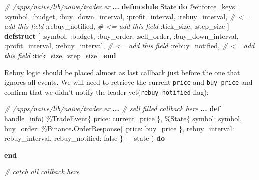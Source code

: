 \documentclass[
  oneside]{book}
\newenvironment{Shaded}{\begin{snugshade}}{\end{snugshade}}
\newcommand{\CommentTok}[1]{\textcolor[rgb]{0.56,0.35,0.01}{\textit{#1}}}
\newcommand{\ConstantTok}[1]{\textcolor[rgb]{0.00,0.00,0.00}{#1}}
\newcommand{\KeywordTok}[1]{\textcolor[rgb]{0.13,0.29,0.53}{\textbf{#1}}}
\newcommand{\NormalTok}[1]{#1}
\newcommand{\OperatorTok}[1]{\textcolor[rgb]{0.81,0.36,0.00}{\textbf{#1}}}
\newcommand{\OtherTok}[1]{\textcolor[rgb]{0.56,0.35,0.01}{#1}}
\newcommand{\VariableTok}[1]{\textcolor[rgb]{0.00,0.00,0.00}{#1}}
\begin{document}
\begin{Shaded}
\begin{Highlighting}[]
  \CommentTok{\# /apps/naive/lib/naive/trader.ex}
  \OperatorTok{...}
  \KeywordTok{defmodule} \ConstantTok{State} \KeywordTok{do}
    \OtherTok{@enforce\_keys}\NormalTok{ [}
      \VariableTok{:symbol}\NormalTok{,}
      \VariableTok{:budget}\NormalTok{,}
      \VariableTok{:buy\_down\_interval}\NormalTok{,}
      \VariableTok{:profit\_interval}\NormalTok{,}
      \VariableTok{:rebuy\_interval}\NormalTok{, }\CommentTok{\# \textless{}= add this field}
      \VariableTok{:rebuy\_notified}\NormalTok{, }\CommentTok{\# \textless{}= add this field}
      \VariableTok{:tick\_size}\NormalTok{,}
      \VariableTok{:step\_size}
\NormalTok{    ]}
    \KeywordTok{defstruct}\NormalTok{ [}
      \VariableTok{:symbol}\NormalTok{,}
      \VariableTok{:budget}\NormalTok{,}
      \VariableTok{:buy\_order}\NormalTok{,}
      \VariableTok{:sell\_order}\NormalTok{,}
      \VariableTok{:buy\_down\_interval}\NormalTok{,}
      \VariableTok{:profit\_interval}\NormalTok{,}
      \VariableTok{:rebuy\_interval}\NormalTok{, }\CommentTok{\# \textless{}= add this field}
      \VariableTok{:rebuy\_notified}\NormalTok{, }\CommentTok{\# \textless{}= add this field}
      \VariableTok{:tick\_size}\NormalTok{,}
      \VariableTok{:step\_size}
\NormalTok{    ]}
  \KeywordTok{end}
\end{Highlighting}
\end{Shaded}

Rebuy logic should be placed almost as last callback just before the one that ignores all events. We will need to retrieve the current \texttt{price} and \texttt{buy\_price} and confirm that we didn't notify the leader yet(\texttt{rebuy\_notified} flag):

\begin{Shaded}
\begin{Highlighting}[]
  \CommentTok{\# /apps/naive/lib/naive/trader.ex}
  \OperatorTok{...}
  \CommentTok{\# sell filled callback here}
  \OperatorTok{...}
  \KeywordTok{def}\NormalTok{ handle\_info(}
\NormalTok{        \%}\ConstantTok{TradeEvent}\NormalTok{\{}
          \VariableTok{price:}\NormalTok{ current\_price}
\NormalTok{        \},}
\NormalTok{        \%}\ConstantTok{State}\NormalTok{\{}
          \VariableTok{symbol:}\NormalTok{ symbol,}
          \VariableTok{buy\_order:}\NormalTok{ \%}\ConstantTok{Binance}\OperatorTok{.}\ConstantTok{OrderResponse}\NormalTok{\{}
            \VariableTok{price:}\NormalTok{ buy\_price}
\NormalTok{          \},}
          \VariableTok{rebuy\_interval:}\NormalTok{ rebuy\_interval,}
          \VariableTok{rebuy\_notified:} \ConstantTok{false}
\NormalTok{        \} }\OperatorTok{=}\NormalTok{ state}
\NormalTok{      ) }\KeywordTok{do}

  \KeywordTok{end}

  \CommentTok{\# catch all callback here}
\end{Highlighting}
\end{Shaded}
\end{document}

